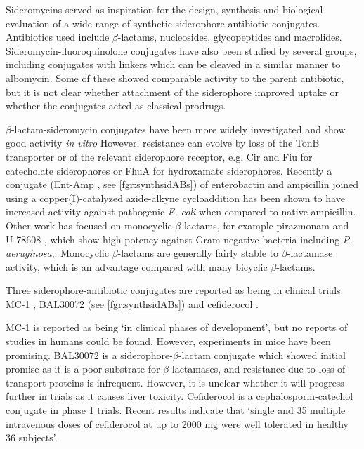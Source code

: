 Sideromycins served as inspiration for the design, synthesis and biological evaluation of a wide range of synthetic siderophore-antibiotic conjugates\cite{Page2013}. Antibiotics used include $\beta$-lactams\cite{Mollmann2009,Dini2000,Kline2000}, nucleosides\cite{Lu1999}, glycopeptides\cite{Ghosh1996} and macrolides\cite{Ghosh1995}. Sideromycin-fluoroquinolone conjugates have also been studied by several groups\cite{Md-Saleh2009,Rivault2007,Ji2012}, including conjugates with linkers which can be cleaved\cite{Rivault2007,Ji2012} in a similar manner to albomycin\cite{Hartmann1979}. Some of these showed comparable activity to the parent antibiotic, but it is not clear whether attachment of the siderophore improved uptake or whether the conjugates acted as classical prodrugs.

$\beta$-lactam-sideromycin conjugates have been more widely investigated and show good activity \textit{in vitro} However, resistance can evolve by loss of the TonB transporter or of the relevant siderophore receptor, e.g. Cir and Fiu for catecholate siderophores or FhuA for hydroxamate siderophores\cite{Page2013}. 
Recently a conjugate (Ent-Amp , see \ref{fgr:synthsidABs}) of enterobactin and ampicillin joined using a copper(I)-catalyzed azide-alkyne cycloaddition has been shown to have increased activity against pathogenic \textit{E. coli} when compared to native ampicillin\cite{Zheng2014}. 
Other work has focused on monocyclic $\beta$-lactams, for example pirazmonam  and U-78608 , which show high potency against Gram-negative bacteria including \textit{P. aeruginosa},\cite{Zurenko1990,Harrington2012}. Monocyclic $\beta$-lactams are generally fairly stable to $\beta$-lactamase activity, which is an advantage compared with many bicyclic $\beta$-lactams.

Three siderophore-antibiotic conjugates are reported as being in clinical trials\cite{Schalk2017}: MC-1 \cite{McPherson2012}, BAL30072 \cite{Page2013} (see \ref{fgr:synthsidABs}) and cefiderocol \cite{Ito2018,Saisho2018}.

MC-1  is reported as being `in clinical phases of development'\cite{Schalk2017}, but no reports of studies in humans could be found. However, experiments in mice have been promising\cite{McPherson2012}.
BAL30072  is a siderophore-$\beta$-lactam conjugate which showed initial promise as it is a poor substrate for $\beta$-lactamases, and resistance due to loss of transport proteins is infrequent\cite{Page2013}. However, it is unclear whether it will progress further in trials as it causes liver toxicity\cite{Paech2017}. 
Cefiderocol  is a cephalosporin-catechol conjugate in phase 1 trials. Recent results indicate that `single and 35 multiple intravenous doses of cefiderocol at up to 2000 mg were well tolerated in healthy 36 subjects'\cite{Saisho2018}.


